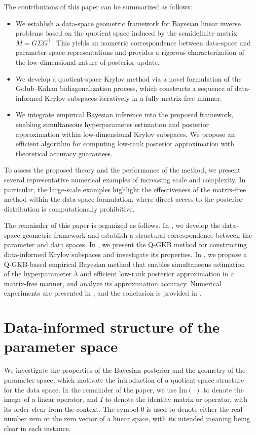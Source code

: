 \documentclass[]{myarticle}
\begin{document}
The contributions of this paper can be summarized as follows:
\begin{itemize}
    \item We establish a data-space geometric framework for Bayesian linear inverse problems based on the quotient space induced by the semidefinite matrix $M = G \Sigma G^\top$. This yields an isometric correspondence between data-space and parameter-space representations and provides a rigorous characterization of the low-dimensional nature of posterior update.
    \item We develop a quotient-space Krylov method via a novel formulation of the Golub--Kahan bidiagonalization process, which constructs a sequence of data-informed Krylov subspaces iteratively in a fully matrix-free manner.
    \item We integrate empirical Bayesian inference into the proposed framework, enabling simultaneous hyperparameter estimation and posterior approximation within low-dimensional Krylov subspaces. We propose an efficient algorithm for computing low-rank posterior approximation with theoretical accuracy guarantees.
\end{itemize}
To assess the proposed theory and the performance of the method, we present several representative numerical examples of increasing scale and complexity. In particular, the large-scale examples highlight the effectiveness of the matrix-free method within the data-space formulation, where direct access to the posterior distribution is computationally prohibitive.

The remainder of this paper is organized as follows. In , we develop the data-space geometric framework and establish a structural correspondence between the parameter and data spaces. In , we present the Q-GKB method for constructing data-informed Krylov subspaces and investigate its properties. In , we propose a Q-GKB-based empirical Bayesian method that enables simultaneous estimation of the hyperparameter $\lambda$ and efficient low-rank posterior approximation in a matrix-free manner, and analyze its approximation accuracy. Numerical experiments are presented in , and the conclusion is provided in .


\section{Data-informed structure of the parameter space} \label{sec2}
We investigate the properties of the Bayesian posterior and the geometry of the parameter space, which motivate the introduction of a quotient-space structure for the data space. In the remainder of the paper, we use $\mathrm{Im}(\cdot)$ to denote the image of a linear operator, and $I$ to denote the identity matrix or operator, with its order clear from the context. The symbol $0$ is used to denote either the real number zero or the zero vector of a linear space, with its intended meaning being clear in each instance.
\end{document}
